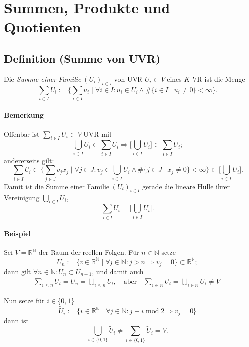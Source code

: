 \section{Summen, Produkte und Quotienten}
 \subsection{Definition (Summe von UVR)}
 	\begin{Definition}
 		Die \emph{Summe einer Familie} $ (U_i)_{i\in I} $ von UVR $ U_i\subset V $ eines $ K $-VR ist die Menge
 		\[
 			\sum_{i\in I} U_i := \Big\{\sum_{i \in I}u_i\mid \forall i\in I: u_i\in U_i \land \# \{i\in I\mid u_i \neq 0\}<\infty\Big\}.
 		\]
 	\end{Definition}

 	\paragraph{Bemerkung}
 		Offenbar ist $ \sum_{i\in I} U_i\subset V $ UVR mit
 		\[
 			\bigcup_{i\in I}U_i \subset \sum_{i\in I} U_i \Rightarrow \Big[\bigcup_{i\in I}U_i\Big]\subset \sum_{i\in I} U_i;
 		\]
 		andererseits gilt:
 		\[
 			\sum_{i\in I}U_i \subset \Big\{\sum_{j\in J}v_jx_j\mid \forall j\in J: v_j\in \bigcup_{i\in I}U_i \land \#\{j\in J\mid x_j\neq 0\}<\infty\Big\}\subset \Big[\bigcup_{i\in I}U_i\Big].
 		\]
 		Damit ist die Summe einer Familie $ (U_i)_{i\in I} $ gerade die lineare Hülle ihrer Vereinigung $ \bigcup_{i\in I}U_i $,
 		\[
 			\sum_{i\in I}U_i= \Big[\bigcup_{i\in I}U_i\Big].
 		\]

 	\paragraph{Beispiel}
 		Sei $ V=\mathbb{R}^\mathbb{N} $ der Raum der reellen Folgen. Für $ n\in \mathbb{N} $ setze
 		\[
 			U_n := \{v\in \mathbb{R}^\mathbb{N}\mid \forall j\in \mathbb{N}: j>n\Rightarrow v_j = 0 \} \subset \mathbb{R}^\mathbb{N};
 		\]
 		dann gilt $ \forall n\in \mathbb{N}: U_n\subset U_{n+1} $, und damit auch
 		\begin{gather*}
 			\sum_{i\leq n} U_i = U_n = \bigcup_{i\leq n}U_i, \quad\text{aber}\quad \sum_{i\in \mathbb{N}}U_i = \bigcup_{i\in \mathbb{N}}U_i \neq V.
 		\end{gather*}

 		Nun setze für $ i\in \{0,1\} $
 		\[
 			\tilde{U}_i := \{v\in \mathbb{R}^\mathbb{N}\mid \forall j\in \mathbb{N}: j\equiv
 			i\operatorname{mod} 2\Rightarrow v_j = 0\}
 		\]
 		dann ist
 		\[
 			\bigcup_{i\in \{0,1\}}\tilde{U}_i \neq \sum_{i\in \{0,1\}}\tilde{U}_i = V.
 		\]

